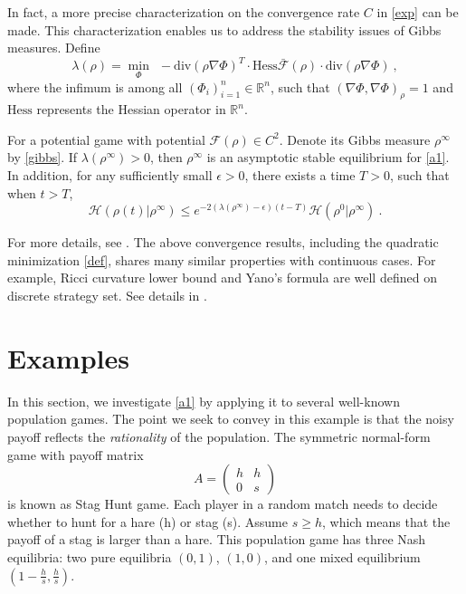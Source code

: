 \documentclass[11pt,reqno]{amsart}
\begin{document}
In fact, a more precise characterization on the convergence rate $C$ in \eqref{exp} can be made. This characterization enables us to address the stability issues of Gibbs measures. Define
\begin{equation}\label{def}
\lambda(\rho)=\min_{\Phi}~~-\textrm{div}(\rho\nabla\Phi)^T\cdot\textrm{Hess}\mathcal{\bar F}(\rho)\cdot \textrm{div}(\rho\nabla\Phi) \ ,
\end{equation}
where the infimum is among all $(\Phi_i)_{i=1}^n\in \mathbb{R}^n$, such that $(\nabla\Phi, \nabla\Phi)_\rho=1$ and $\textrm{Hess}$ represents the Hessian operator in $\mathbb{R}^n$.

\begin{theorem}\label{stability}
For a potential game with potential $\mathcal{F}(\rho)\in C^2$. Denote its Gibbs measure $\rho^\infty$ by \eqref{gibbs}. If $\lambda(\rho^\infty)>0$, then $\rho^{\infty}$ is an asymptotic stable equilibrium for \eqref{a1}. In addition, for any sufficiently small $\epsilon>0$, there exists a time $T>0$, such that when $t>T$, \begin{equation*}
\mathcal{H}(\rho(t)|\rho^\infty)\leq e^{-2(\lambda( \rho^{\infty})-\epsilon)(t-T)}
\mathcal{H}(\rho^0|\rho^\infty)\ .
\end{equation*}
\end{theorem}

For more details, see \cite{li-theory}. The above convergence results, including the quadratic minimization \eqref{def}, shares many similar properties with continuous cases. For example, Ricci curvature lower bound and Yano's formula are well defined on discrete strategy set. See details in \cite{li-theory, li-finite, erbar2012ricci, vil2008}.  
\section{Examples}\label{examples}
In this section, we investigate \eqref{a1} by applying it
to several well-known population games.  
  The point we seek to convey in this example is that the noisy payoff reflects the \textit{rationality} of the population. The symmetric normal-form game with payoff matrix 
\begin{equation*}
A=\begin{pmatrix}
h&h\\
0&s
\end{pmatrix}
\end{equation*}
is known as Stag Hunt game. 
Each player in a random match needs to decide whether to hunt for a hare (h) or
stag (s). Assume $s\geq h$, which means that the payoff of a stag is larger than
a hare. This population game has three Nash equilibria: two pure equilibria
$(0,1)$, $(1,0)$, and one mixed equilibrium $(1-\frac{h}{s}, \frac{h}{s})$.
\end{document}
